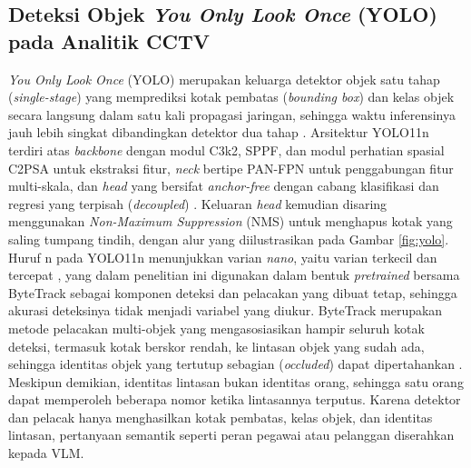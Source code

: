 \subsection{Deteksi Objek \textit{You Only Look Once} (YOLO) pada Analitik CCTV}
\textit{You Only Look Once} (YOLO) merupakan keluarga detektor objek satu tahap (\textit{single-stage}) yang memprediksi kotak pembatas (\textit{bounding box}) dan kelas objek secara langsung dalam satu kali propagasi jaringan, sehingga waktu inferensinya jauh lebih singkat dibandingkan detektor dua tahap \cite{ref2}. Arsitektur YOLO11n terdiri atas \textit{backbone} dengan modul C3k2, SPPF, dan modul perhatian spasial C2PSA untuk ekstraksi fitur, \textit{neck} bertipe PAN-FPN untuk penggabungan fitur multi-skala, dan \textit{head} yang bersifat \textit{anchor-free} dengan cabang klasifikasi dan regresi yang terpisah (\textit{decoupled}) \cite{ref36}. Keluaran \textit{head} kemudian disaring menggunakan \textit{Non-Maximum Suppression} (NMS) untuk menghapus kotak yang saling tumpang tindih, dengan alur yang diilustrasikan pada Gambar \ref{fig:yolo}. Huruf n pada YOLO11n menunjukkan varian \textit{nano}, yaitu varian terkecil dan tercepat \cite{ref36}, yang dalam penelitian ini digunakan dalam bentuk \textit{pretrained} bersama ByteTrack sebagai komponen deteksi dan pelacakan yang dibuat tetap, sehingga akurasi deteksinya tidak menjadi variabel yang diukur. ByteTrack merupakan metode pelacakan multi-objek yang mengasosiasikan hampir seluruh kotak deteksi, termasuk kotak berskor rendah, ke lintasan objek yang sudah ada, sehingga identitas objek yang tertutup sebagian (\textit{occluded}) dapat dipertahankan \cite{ref26}. Meskipun demikian, identitas lintasan bukan identitas orang, sehingga satu orang dapat memperoleh beberapa nomor ketika lintasannya terputus. Karena detektor dan pelacak hanya menghasilkan kotak pembatas, kelas objek, dan identitas lintasan, pertanyaan semantik seperti peran pegawai atau pelanggan diserahkan kepada VLM.

